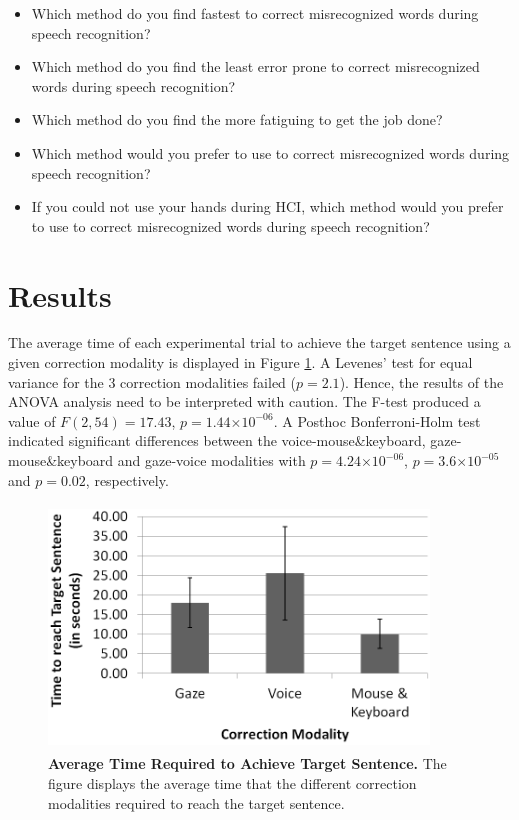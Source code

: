 \documentclass[]{article}
\providecommand{\e}[1]{\ensuremath{\times 10^{#1}}}
\begin{document}
\begin{itemize}
  \item Which method do you find fastest to correct misrecognized words during speech recognition?
	\item Which method do you find the least error prone to correct misrecognized words during speech recognition?
	\item Which method do you find the more fatiguing to get the job done?
	\item Which method would you prefer to use to correct misrecognized words during speech recognition?
	\item If you could not use your hands during HCI, which method would you prefer to use to correct misrecognized words during speech recognition?
\end{itemize}


\section{Results}
The average time of each experimental trial to achieve the target sentence using a given correction modality is
displayed in Figure \ref{timeFig}. A Levenes' test for equal variance for the 3 correction modalities failed ($p=2.1$).
Hence, the results of the ANOVA analysis need to be interpreted with caution. The F-test produced a value of
$F(2,54)=17.43$, $p=1.44\e{-06}$. A Posthoc Bonferroni-Holm test indicated significant differences between the
voice-mouse\&keyboard, gaze-mouse\&keyboard and gaze-voice modalities with $p=4.24\e{-06}$, $p=3.6\e{-05}$ and $p=0.02$,
respectively.
 

\begin{figure}[ht]
\begin{center}
\includegraphics[width=0.9\textwidth,height=65mm]{figures/time.png}
\end{center}
\vspace{-3mm}
\caption{\textbf{Average Time Required to Achieve Target Sentence.} The figure displays the average time that the different
correction modalities required to reach the target sentence.}
\label{timeFig}
\end{figure}
\end{document}
